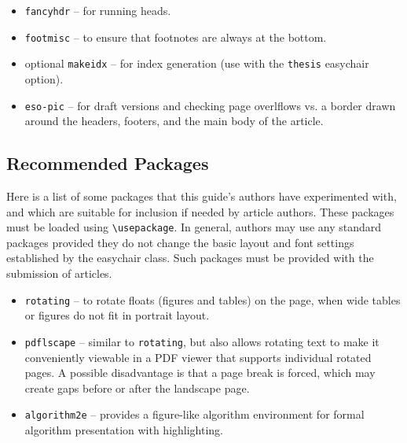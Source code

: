 \documentclass[]{easychair}
\newcommand{\easychair}{\textsf{easychair}}
\begin{document}
\begin{itemize}
\item
\texttt{fancyhdr} \cite{fancyhdr-package} -- for running heads.

\item
\texttt{footmisc} \cite{footmisc-package} -- to ensure that footnotes are
always at the bottom.

\item
optional \texttt{makeidx} \cite{makeidx-package} -- for index generation
(use with the \texttt{thesis} {\easychair} option).

\item
\texttt{eso-pic} \cite{eso-pic-package} -- for draft versions and checking page
overlflows vs. a border drawn around the headers, footers, and the main body of
the article.

\end{itemize}

\subsection{Recommended Packages}
\label{sect:recommended-packages}

Here is a list of some packages that this guide's authors have experimented 
with, and which are suitable for inclusion if needed by article authors.
These packages must be loaded using \verb+\usepackage+.
In general, authors may use any standard packages provided they do not change
the basic layout and font settings established by the {\easychair} class.
Such packages must be provided with the submission of articles.

\begin{itemize}
\item
\texttt{rotating} \cite{rotating-package} -- to rotate floats (figures and
tables) on the page, when wide tables or figures do not fit in portrait layout.

\item
\texttt{pdflscape} \cite{pdflscape-package} -- similar to \texttt{rotating}, 
but also allows rotating text to make it conveniently viewable in a PDF 
viewer that supports individual rotated pages.
A possible disadvantage is that a page break is forced, which may create
gaps before or after the landscape page.

\item
\texttt{algorithm2e} \cite{algorithm2e-package} -- provides a figure-like
algorithm environment for formal algorithm presentation with highlighting.

\end{itemize}
\end{document}
